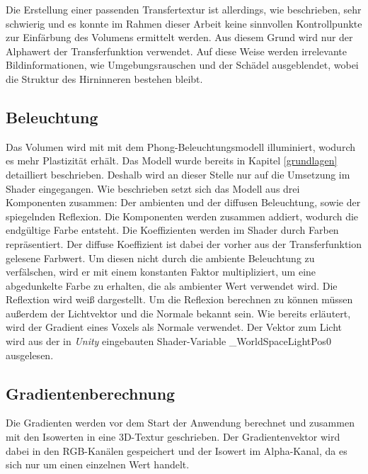 Die Erstellung einer passenden Transfertextur ist allerdings, wie beschrieben, sehr schwierig und es konnte im Rahmen dieser Arbeit keine sinnvollen Kontrollpunkte zur Einfärbung des Volumens ermittelt werden. Aus diesem Grund wird nur der Alphawert der Transferfunktion verwendet. Auf diese Weise werden irrelevante Bildinformationen, wie Umgebungsrauschen und der Schädel ausgeblendet, wobei die Struktur des Hirninneren bestehen bleibt. 

\subsection{Beleuchtung}
\label{illumination}

Das Volumen wird mit mit dem Phong-Beleuchtungsmodell illuminiert, wodurch es mehr Plastizität erhält. Das Modell wurde bereits in Kapitel \ref{grundlagen} detailliert beschrieben. Deshalb wird an dieser Stelle nur auf die Umsetzung im Shader eingegangen.
Wie beschrieben setzt sich das Modell aus drei Komponenten zusammen: Der ambienten und der diffusen Beleuchtung, sowie der spiegelnden Reflexion. Die Komponenten werden zusammen addiert, wodurch die endgültige Farbe entsteht. 
Die Koeffizienten werden im Shader durch Farben repräsentiert. Der diffuse Koeffizient ist dabei der vorher aus der Transferfunktion gelesene Farbwert. Um diesen nicht durch die ambiente Beleuchtung zu verfälschen, wird er mit einem konstanten Faktor multipliziert, um eine abgedunkelte Farbe zu erhalten, die als ambienter Wert verwendet wird. Die Reflextion wird weiß dargestellt.
Um die Reflexion berechnen zu können müssen außerdem der Lichtvektor und die Normale bekannt sein.
Wie bereits erläutert, wird der Gradient eines Voxels als Normale verwendet. 
Der Vektor zum Licht wird aus der in \textit{Unity} eingebauten Shader-Variable \_WorldSpaceLightPos0 ausgelesen.

\subsection{Gradientenberechnung}
\label{gradienten}


Die Gradienten werden vor dem Start der Anwendung berechnet und zusammen mit den Isowerten in eine 3D-Textur geschrieben. Der Gradientenvektor wird dabei in den RGB-Kanälen gespeichert und der Isowert im Alpha-Kanal, da es sich nur um einen einzelnen Wert handelt. 

